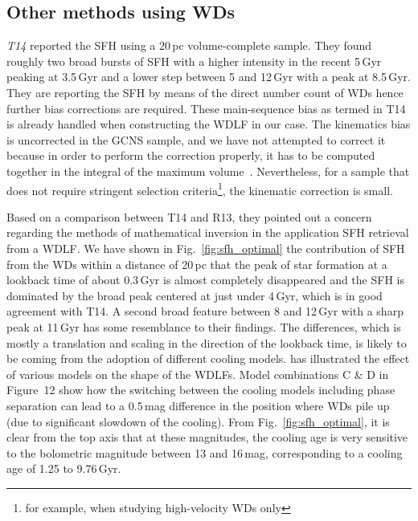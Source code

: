 \documentclass[fleqn,usenatbib]{mnras}
\begin{document}


\subsection{Other methods using WDs}
\textit{T14} reported the SFH using a 20\,pc volume-complete sample. They found roughly
two broad bursts of SFH with a higher intensity in the recent 5\,Gyr peaking at
3.5\,Gyr and a lower step between 5 and 12\,Gyr with a peak at 8.5\,Gyr. They
are reporting the SFH by means of the direct number count of WDs hence further
bias corrections are required. These main-sequence bias as termed in T14 
is already handled when constructing the WDLF in our case. The kinematics bias
is uncorrected in the GCNS sample, and we have not attempted to correct it
because in order to perform the correction properly, it has to be computed 
together in the integral of the maximum volume~\citep{2015MNRAS.450.4098L}.
Nevertheless, for a sample that does not require stringent selection
criteria\footnote{for example, when studying high-velocity WDs only}, the
kinematic correction is small.

Based on a comparison between T14 and R13, they pointed out a concern regarding
the methods of mathematical inversion in the application SFH retrieval from a
WDLF. We have shown in Fig.~\ref{fig:sfh_optimal} the contribution of SFH
from the WDs within a distance of 20\,pc that the peak of star formation at a
lookback time of about 0.3\,Gyr is almost completely disappeared and the SFH is
dominated by the broad peak centered at just under 4\,Gyr, which is in good
agreement with T14. A second broad feature between 8 and 12\,Gyr with a sharp
peak at 11\,Gyr has some resemblance to their findings. The differences, which
is mostly a translation and scaling in the direction of the lookback time, is
likely to be coming from the adoption of different cooling models. 
\citet{2022RASTI...1...81L} has illustrated the effect of various models on 
the shape of the WDLFs. Model combinations C \& D in Figure~12 show how the 
switching between the cooling models including phase separation can lead to
a 0.5\,mag difference in the position where WDs pile up (due to significant
slowdown of the cooling). From Fig.~\ref{fig:sfh_optimal}, it is clear from the
top axis that at these magnitudes, the cooling age is very sensitive to the
bolometric magnitude between 13 and 16\,mag, corresponding to a cooling age of
1.25 to 9.76\,Gyr.
\end{document}
